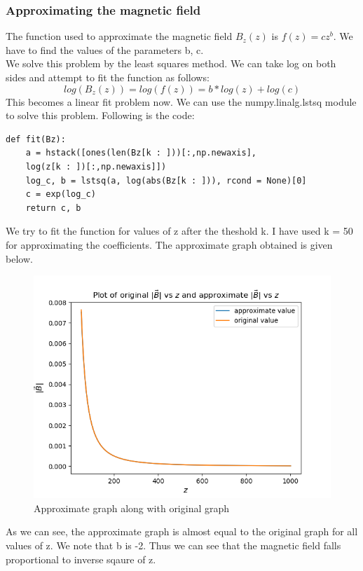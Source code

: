 \documentclass[11pt, a4paper]{article}
\begin{document}
\subsubsection{Approximating the magnetic field}
The function used to approximate the magnetic field $B_z(z)$ is $f(z) = cz^b$. We have to find the values of the parameters b, c.
\\We solve this problem by the least squares method. We can take log on both sides and attempt to fit the function as follows:
\begin{equation}
log(B_z(z)) = log(f(z)) = b * log(z) + log(c)
\end{equation}
This becomes a linear fit problem now. We can use the numpy.linalg.lstsq module to solve this problem.
Following is the code:
\begin{lstlisting}
def fit(Bz):
	a = hstack([ones(len(Bz[k : ]))[:,np.newaxis],
	log(z[k : ])[:,np.newaxis]])
	log_c, b = lstsq(a, log(abs(Bz[k : ])), rcond = None)[0]
	c = exp(log_c)
	return c, b
\end{lstlisting}
We try to fit the function for values of z after the theshold k.
I have used k = 50 for approximating the coefficients. The approximate graph obtained is given below.\\

\begin{figure}[!tbh]
   	\centering
   	\includegraphics[scale=0.5]{fig6.png}  %
   	\caption{Approximate graph along with original graph}
   	\label{fig:sample}
   \end{figure}
   As we can see, the approximate graph is almost equal to the original graph for all values of z. We note that b is -2. Thus we can see that the magnetic field falls proportional to inverse sqaure of z.
\newpage
\end{document}
